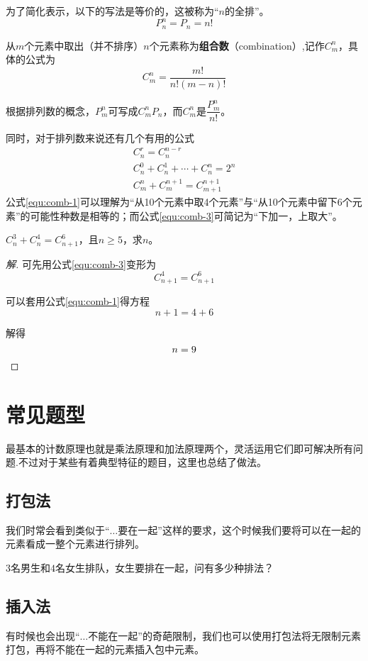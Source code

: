 为了简化表示，以下的写法是等价的，这被称为“$n$的全排”。\[P_n^n=P_n=n!\]

从$m$个元素中取出（并不排序）$n$个元素称为\textbf{组合数}（combination）,记作$C_m^n$，具体的公式为\[C_m^n=\frac{m!}{n!(m-n)!}\]

根据排列数的概念，$P_m^n$可写成$C_m^nP_n$，而$C_m^n$是$\dfrac{P_m^n}{n!}$。

同时，对于排列数来说还有几个有用的公式
\begin{gather}
	C_n^r=C_n^{n-r} \label{equ:comb-1} \\
	C_n^0+C_n^1+\cdots+C_n^n=2^n \label{equ:comb-2} \\
	C_m^n+C_m^{n+1}=C_{m+1}^{n+1} \label{equ:comb-3}
\end{gather}
公式\eqref{equ:comb-1}可以理解为“从10个元素中取4个元素”与“从10个元素中留下6个元素”的可能性种数是相等的；而公式\eqref{equ:comb-3}可简记为“下加一，上取大”。

\begin{example}
	$C_n^3+C_n^4=C_{n+1}^6$，且$n\geq5$，求$n$。
\end{example}

\begin{proof}[解]
	可先用公式\eqref{equ:comb-3}变形为\[C_{n+1}^4=C_{n+1}^6\]

	可以套用公式\eqref{equ:comb-1}得方程\[n+1=4+6\]

	解得\[n=9\qedhere\]
\end{proof}

\section{常见题型}
最基本的计数原理也就是乘法原理和加法原理两个，灵活运用它们即可解决所有问题.不过对于某些有着典型特征的题目，这里也总结了做法。

\subsection{打包法}
我们时常会看到类似于“$\dots$要在一起”这样的要求，这个时候我们要将可以在一起的元素看成一整个元素进行排列。

\begin{example}
	$3$名男生和$4$名女生排队，女生要排在一起，问有多少种排法？
\end{example}

\subsection{插入法}
有时候也会出现“$\dots$不能在一起”的奇葩限制，我们也可以使用打包法将无限制元素打包，再将不能在一起的元素插入包中元素。

